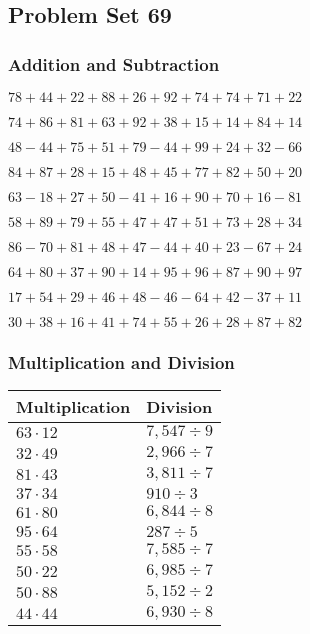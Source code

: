 \hypertarget{problem-set-69}{%
\subsection{Problem Set 69}\label{problem-set-69}}

\hypertarget{addition-and-subtraction}{%
\subsubsection{Addition and
Subtraction}\label{addition-and-subtraction}}

\(78+44+22+88+26+92+74+74+71+22\)

\(74+86+81+63+92+38+15+14+84+14\)

\(48-44+75+51+79-44+99+24+32-66\)

\(84+87+28+15+48+45+77+82+50+20\)

\(63-18+27+50-41+16+90+70+16-81\)

\(58+89+79+55+47+47+51+73+28+34\)

\(86-70+81+48+47-44+40+23-67+24\)

\(64+80+37+90+14+95+96+87+90+97\)

\(17+54+29+46+48-46-64+42-37+11\)

\(30+38+16+41+74+55+26+28+87+82\)

\hypertarget{multiplication-and-division}{%
\subsubsection{Multiplication and
Division}\label{multiplication-and-division}}

\begin{longtable}[]{@{}ll@{}}
\toprule
Multiplication & Division\tabularnewline
\midrule
\endhead
\(63\cdot12\) & \(7,547÷9\)\tabularnewline
\(32\cdot49\) & \(2,966÷7\)\tabularnewline
\(81\cdot43\) & \(3,811÷7\)\tabularnewline
\(37\cdot34\) & \(910÷3\)\tabularnewline
\(61\cdot80\) & \(6,844÷8\)\tabularnewline
\(95\cdot64\) & \(287÷5\)\tabularnewline
\(55\cdot58\) & \(7,585÷7\)\tabularnewline
\(50\cdot22\) & \(6,985÷7\)\tabularnewline
\(50\cdot88\) & \(5,152÷2\)\tabularnewline
\(44\cdot44\) & \(6,930÷8\)\tabularnewline
\bottomrule
\end{longtable}
